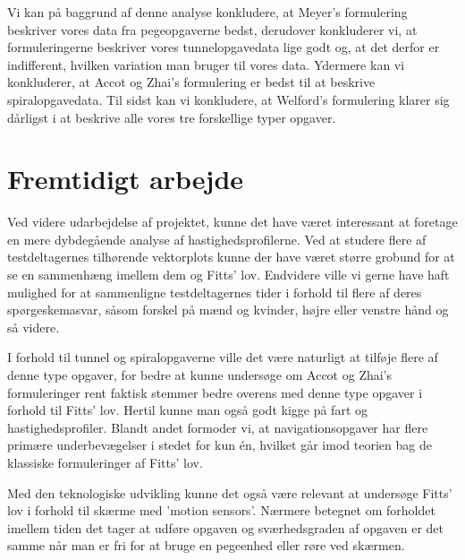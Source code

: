 Vi kan på baggrund af denne analyse konkludere, at Meyer's formulering beskriver vores data fra pegeopgaverne bedst, derudover konkluderer vi, at formuleringerne beskriver vores tunnelopgavedata lige godt og, at det derfor er indifferent, hvilken variation man bruger til vores data. Ydermere kan vi konkluderer, at Accot og Zhai's formulering er bedst til at beskrive spiralopgavedata. Til sidst kan vi konkludere, at Welford's formulering klarer sig dårligst i at beskrive alle vores tre forskellige typer opgaver.

\section*{Fremtidigt arbejde}
Ved videre udarbejdelse af projektet, kunne det have været interessant at foretage en mere dybdegående analyse af hastighedsprofilerne. Ved at studere flere af testdeltagernes tilhørende vektorplots kunne der have været større grobund for at se en sammenhæng imellem dem og Fitts' lov. Endvidere ville vi gerne have haft mulighed for at sammenligne testdeltagernes tider i forhold til flere af deres spørgeskemasvar, såsom forskel på mænd og kvinder, højre eller venstre hånd og så videre.

I forhold til tunnel og spiralopgaverne ville det være naturligt at tilføje flere af denne type opgaver, for bedre at kunne undersøge om Accot og Zhai's formuleringer rent faktisk stemmer bedre overens med denne type opgaver i forhold til Fitts' lov. Hertil kunne man også godt kigge på fart og hastighedsprofiler. Blandt andet formoder vi, at navigationsopgaver har flere primære underbevægelser i stedet for kun én, hvilket går imod teorien bag de klassiske formuleringer af Fitts' lov.

Med den teknologiske udvikling kunne det også være relevant at undersøge Fitts' lov i forhold til skærme med 'motion sensors'. Nærmere betegnet om forholdet imellem tiden det tager at udføre opgaven og sværhedsgraden af opgaven er det samme når man er fri for at bruge en pegeenhed eller røre ved skærmen.


\nocite{*}

\printbibliography

